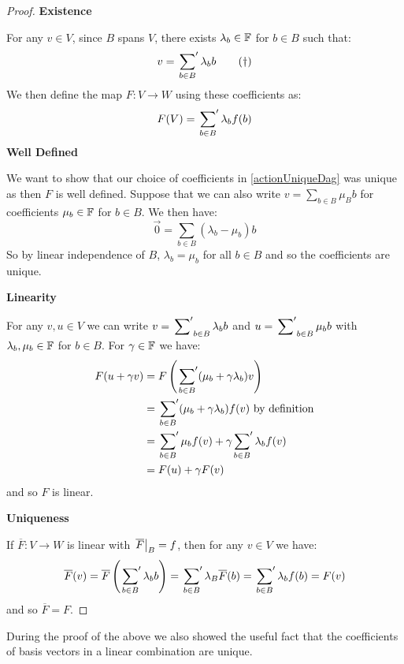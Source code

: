 \documentclass[../main.tex]{subfiles}
\begin{document}
\begin{proof}\par
  \textbf{Existence}\par
  For any $v \in V$, since $B$ spans $V$, there exists $\lambda_b \in \mathbb{F}$ for $b \in B$ such that:
  \begin{equation}
    v = \sideset{}{'}\sum_{b \in B} \lambda_b b \label{actionUniqueDag} \tag{\dag}
  \end{equation}
  We then define the map $F: V \to W$ using these coefficients as:
  \[
    F(V) = \sideset{}{'}\sum_{b \in B} \lambda_b f(b)
  \]
  \textbf{Well Defined}\par
  We want to show that our choice of coefficients in \cref{actionUniqueDag} was unique as then $F$ is well defined.
  Suppose that we can also write $v = \sum_{b \in B} \mu_B b$ for coefficients $\mu_b \in \mathbb{F}$ for $b \in B$.
  We then have:
  \[
    \vec{0} = \sum_{b \in B} (\lambda_b - \mu_b) b
  \]
  So by linear independence of $B$, $\lambda_b = \mu_b$ for all $b \in B$ and so the coefficients are unique.

  \textbf{Linearity}\par
  For any $v, u \in V$ we can write $v = \sideset{}{'}\sum_{b \in B} \lambda_b b$ and $u = \sideset{}{'}\sum_{b \in B} \mu_b b$ with $\lambda_b, \mu_b \in \mathbb{F}$ for $b \in B$.
  For $\gamma \in \mathbb{F}$ we have:
  \begin{align*}
    F(u + \gamma v) &= F\left(\sideset{}{'}\sum_{b \in B} (\mu_b + \gamma \lambda_b) v\right) \\
                     &= \sideset{}{'}\sum_{b \in B} (\mu_b + \gamma \lambda_b) f(v) \text{ by definition} \\
                     &= \sideset{}{'}\sum_{b \in B} \mu_b f(v) + \gamma \sideset{}{'}\sum_{b \in B} \lambda_b f(v) \\
                     &= F(u) + \gamma F(v)
  \end{align*}
  and so $F$ is linear.

  \textbf{Uniqueness}\par
  If $\overline{F}: V \to W$ is linear with $\left. \overline{F} \right|_{B} = f$, then for any $v \in V$ we have:
  \[
    \overline{F}(v) = \overline{F}\left(\sideset{}{'}\sum_{b \in B} \lambda_b b\right)  = \sideset{}{'}\sum_{b \in B} \lambda_B \overline{F}(b) = \sideset{}{'}\sum_{b \in B} \lambda_b f(b) = F(v)
  \]
  and so $\overline{F} = F$.
\end{proof}
\begin{remark}
  During the proof of the above we also showed the useful fact that the coefficients of basis vectors in a linear combination are unique.
\end{remark}
\end{document}
